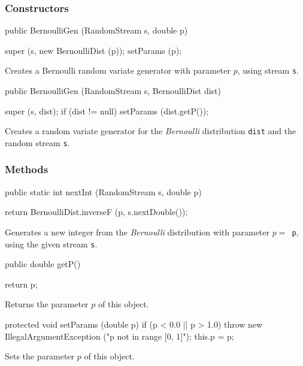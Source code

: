 \subsubsection* {Constructors}
\begin{code}

   public BernoulliGen (RandomStream s, double p)\begin{hide} {
      super (s, new BernoulliDist (p));
      setParams (p);
   }\end{hide}
\end{code}
  \begin{tabb}
  Creates a Bernoulli random variate generator with parameter $p$,
  using stream \texttt{s}.
 \end{tabb}
\begin{code}

   public BernoulliGen (RandomStream s, BernoulliDist dist) \begin{hide} {
      super (s, dist);
      if (dist != null)
         setParams (dist.getP());
   }\end{hide}
\end{code}
  \begin{tabb} Creates a random variate generator for the {\em Bernoulli\/} 
    distribution \texttt{dist} and the random stream \texttt{s}. 
 \end{tabb}

\subsubsection* {Methods}
\begin{code}

   public static int nextInt (RandomStream s, double p)\begin{hide} {
      return BernoulliDist.inverseF (p, s.nextDouble());
   }\end{hide}
\end{code}
\begin{tabb}
   Generates a new integer from the {\em Bernoulli\/} distribution with
  parameter $p = $~\texttt{p}, using the given stream \texttt{s}.
\end{tabb}
\begin{code}

   public double getP()\begin{hide} {
      return p;
   }
   \end{hide}
\end{code}
\begin{tabb} Returns the parameter $p$ of this object.
\end{tabb}
\begin{hide}\begin{code}

   protected void setParams (double p) {
      if (p < 0.0 || p > 1.0)
         throw new IllegalArgumentException ("p not in range [0, 1]");
      this.p = p;
   }
\end{code}
\begin{tabb} Sets the parameter $p$ of this object.
\end{tabb}
\begin{code}
}
\end{code}
\end{hide}
